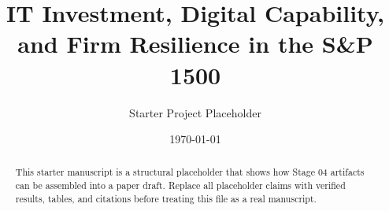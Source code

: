 \documentclass[12pt]{article}
\title{IT Investment, Digital Capability, and Firm Resilience in the S\&P 1500}
\author{Starter Project Placeholder}
\date{\today}
\begin{document}
\maketitle

\begin{abstract}
This starter manuscript is a structural placeholder that shows how Stage 04 artifacts can be assembled into a paper draft. Replace all placeholder claims with verified results, tables, and citations before treating this file as a real manuscript.
\end{abstract}









\end{document}
